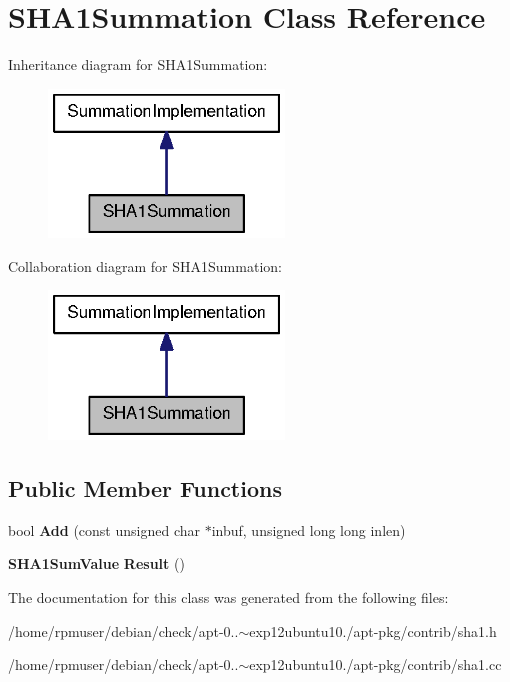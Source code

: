 \section{\-S\-H\-A1\-Summation \-Class \-Reference}
\label{classSHA1Summation}


\-Inheritance diagram for \-S\-H\-A1\-Summation\-:
\nopagebreak
\begin{figure}[H]
\begin{center}
\leavevmode
\includegraphics[width=178pt]{classSHA1Summation__inherit__graph}
\end{center}
\end{figure}


\-Collaboration diagram for \-S\-H\-A1\-Summation\-:
\nopagebreak
\begin{figure}[H]
\begin{center}
\leavevmode
\includegraphics[width=178pt]{classSHA1Summation__coll__graph}
\end{center}
\end{figure}
\subsection*{\-Public \-Member \-Functions}
\begin{DoxyCompactItemize}
\item 
bool {\bfseries \-Add} (const unsigned char $\ast$inbuf, unsigned long long inlen)\label{classSHA1Summation_a40d3316c4ec4117ba34228572ea32a65}

\item 
{\bf \-S\-H\-A1\-Sum\-Value} {\bfseries \-Result} ()\label{classSHA1Summation_a730784552136c37fd6abd99657120567}

\end{DoxyCompactItemize}


\-The documentation for this class was generated from the following files\-:\begin{DoxyCompactItemize}
\item 
/home/rpmuser/debian/check/apt-\/0..$\sim$exp12ubuntu10./apt-\/pkg/contrib/sha1.\-h\item 
/home/rpmuser/debian/check/apt-\/0..$\sim$exp12ubuntu10./apt-\/pkg/contrib/sha1.\-cc\end{DoxyCompactItemize}
